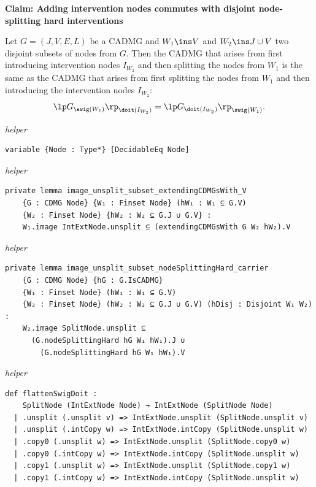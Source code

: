\noindent\textbf{Claim: Adding intervention nodes commutes with disjoint node-splitting hard interventions}\par\smallskip
{\appendixTexSize
  Let $G=(J,V,E,L)$ be a CADMG and $W_1 \ins V$ and $W_2 \ins J \cup V$ two disjoint subsets of nodes from $G$.
    Then the CADMG that arises from first introducing intervention nodes $I_{W_2}$ and then splitting the nodes from $W_1$ is the same as the CADMG that arises from first splitting the nodes from $W_1$ and then introducing the intervention nodes $I_{W_2}$:
    \[  \lp G_{\swig(W_1)} \rp_{\doit(I_{W_2})} = \lp G_{\doit(I_{W_2})} \rp_{\swig(W_1)}. \]
\par}
\smallskip
{\small\textit{helper}}
\begin{verbatim}
variable {Node : Type*} [DecidableEq Node]
\end{verbatim}
{\small\textit{helper}}
\begin{verbatim}
private lemma image_unsplit_subset_extendingCDMGsWith_V
    {G : CDMG Node} {W₁ : Finset Node} (hW₁ : W₁ ⊆ G.V)
    {W₂ : Finset Node} {hW₂ : W₂ ⊆ G.J ∪ G.V} :
    W₁.image IntExtNode.unsplit ⊆ (extendingCDMGsWith G W₂ hW₂).V
\end{verbatim}
{\small\textit{helper}}
\begin{verbatim}
private lemma image_unsplit_subset_nodeSplittingHard_carrier
    {G : CDMG Node} {hG : G.IsCADMG}
    {W₁ : Finset Node} (hW₁ : W₁ ⊆ G.V)
    {W₂ : Finset Node} (hW₂ : W₂ ⊆ G.J ∪ G.V) (hDisj : Disjoint W₁ W₂) :
    W₂.image SplitNode.unsplit ⊆
      (G.nodeSplittingHard hG W₁ hW₁).J ∪
        (G.nodeSplittingHard hG W₁ hW₁).V
\end{verbatim}
{\small\textit{helper}}
\begin{verbatim}
def flattenSwigDoit :
    SplitNode (IntExtNode Node) → IntExtNode (SplitNode Node)
  | .unsplit (.unsplit v) => IntExtNode.unsplit (SplitNode.unsplit v)
  | .unsplit (.intCopy w) => IntExtNode.intCopy (SplitNode.unsplit w)
  | .copy0 (.unsplit w) => IntExtNode.unsplit (SplitNode.copy0 w)
  | .copy0 (.intCopy w) => IntExtNode.intCopy (SplitNode.unsplit w)
  | .copy1 (.unsplit w) => IntExtNode.unsplit (SplitNode.copy1 w)
  | .copy1 (.intCopy w) => IntExtNode.intCopy (SplitNode.unsplit w)
\end{verbatim}
